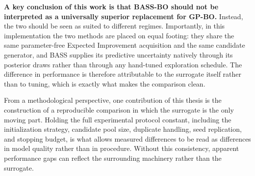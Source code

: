 \textbf{A key conclusion of this work is that BASS-BO should not be interpreted as a universally superior replacement for GP-BO.} Instead, the two should be seen as suited to different regimes.  Importantly, in this implementation the two methods are placed on equal footing: they share the same parameter-free Expected Improvement acquisition and the same candidate generator, and BASS supplies its predictive uncertainty natively through its posterior draws rather than through any hand-tuned exploration schedule. The difference in performance is therefore attributable to the surrogate itself rather than to tuning, which is exactly what makes the comparison clean.

From a methodological perspective, one contribution of this thesis is the construction of a reproducible comparison in which the surrogate is the only moving part. Holding the full experimental protocol constant, including the initialization strategy, candidate pool size, duplicate handling, seed replication, and stopping budget, is what allows measured differences to be read as differences in model quality rather than in procedure. Without this consistency, apparent performance gaps can reflect the surrounding machinery rather than the surrogate.

